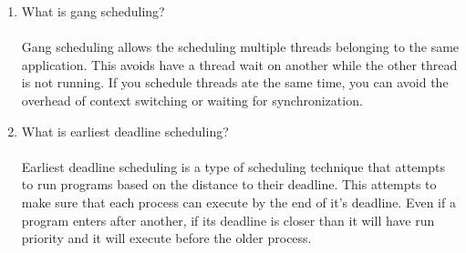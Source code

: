 \documentclass[12pt]{article}
\begin{document}
\begin{enumerate}
   	\item What is gang scheduling? \\ \\
   	Gang scheduling allows the scheduling multiple threads belonging to the same application. This avoids have a thread wait on another while the other thread is not running. If you schedule threads ate the same time, you can avoid the overhead of context switching or waiting for synchronization. \\
   	
   	\item What is earliest deadline scheduling? \\ \\
   	Earliest deadline scheduling is a type of scheduling technique that attempts to run programs based on the distance to their deadline. This attempts to make sure that each process can execute by the end of it's deadline. Even if a program enters after another, if its deadline is closer than it will have run priority and it will execute before the older process.
   	
      
\end{enumerate}
\end{document}
